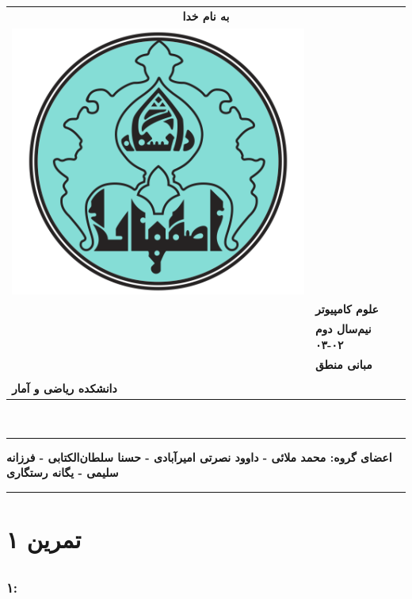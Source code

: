 \documentclass[]{exam}
\begin{document}
\pagestyle{head}
\firstpageheader{}{}{}
\runningheadrule
\begin{tabular}{p{} l}
\multicolumn{2}{c}{\textbf{به نام خدا}}\\
\multirow{2}{*}{\includegraphics[scale=0.2] {UILOGO.png}} & \\ \\
&  \textbf{علوم کامپیوتر}\\
&  \textbf{نیم‌سال دوم ۰۲-۰۳}\\
&  \textbf{مبانی منطق}\\ \\
 \textbf{دانشکده ریاضی و آمار} &  \\
\end{tabular}\\

\rule[1ex]{\textwidth}{.1pt}
\textbf{
    اعضای گروه:
    محمد ملائی - داوود نصرتی امیرآبادی - 
    حسنا سلطان‌الکتابی - فرزانه سلیمی - یگانه رستگاری
}


\rule[1ex]{\textwidth}{.1pt}
\vspace{0pt}

\section*{تمرین ۱}


\subsection*{\color{blue}{جواب}}
\subsubsection*{۱:}

\end{document}
